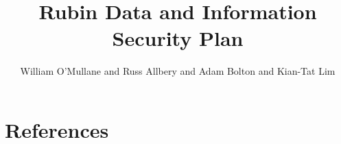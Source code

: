 \documentclass[OPS,lsstdraft,authoryear,toc]{lsstdoc}
\title{Rubin Data and Information Security Plan}
\author{%
William O'Mullane and Russ Allbery and Adam Bolton and Kian-Tat Lim
}
\date{\vcsDate}
\begin{document}
\maketitle


\appendix
\section{References} \label{sec:bib}
\renewcommand{\refname}{} %


%
\printglossaries
\end{document}
